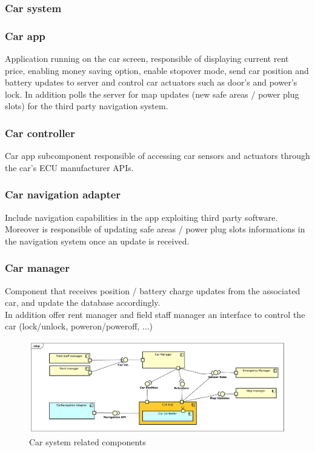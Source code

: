 \documentclass[english]{article}
\begin{document}
\clearpage
\subsubsection*{Car system}

	\subsubsection{Car app}
	Application running on the car screen, responsible of displaying current rent price, enabling money saving option, enable stopover mode, send car position and battery updates to server and control car actuators such as door's and power's lock. In addition polls the server for map updates (new safe areas / power plug slots) for the third party navigation system. 
		\subsubsection{Car controller}
		Car app subcomponent responsible of accessing car sensors and actuators through the car's ECU manufacturer APIs.
		\subsubsection{Car navigation adapter}
		Include navigation capabilities in the app exploiting third party software. Moreover is responsible of updating safe areas / power plug slots informations in the navigation system once an update is received.
	\subsubsection{Car manager}
	Component that receives position / battery charge updates from the associated car, and update the database accordingly. \\In addition offer rent manager and field staff manager an interface to control the car (lock/unlock, poweron/poweroff, ...)
	
	\begin{figure}[H]
		\centering
		\includegraphics[scale=0.35]{./ComponentDiagrams/Car.pdf}%
		\caption{Car system related components}
	\end{figure}
	
\end{document}
